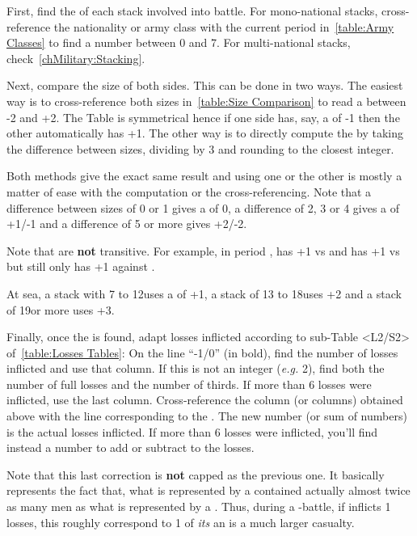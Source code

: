 First, find the  of each stack involved into battle. For
mono-national stacks, cross-reference the nationality or army class with the
current period in~\ref{table:Army Classes} to find a number between 0 and
7. For multi-national stacks, check~\ref{chMilitary:Stacking}.

Next, compare the size of both sides. This can be done in two ways. The
easiest way is to cross-reference both sizes in~\ref{table:Size Comparison} to
read a  between -2 and +2. The Table is symmetrical
hence if one side has, say, a  of -1 then the other
automatically has +1. The other way is to directly compute the  by taking the difference between sizes, dividing by 3 and
rounding to the closest integer.

Both methods give the exact same result and using one or the other is mostly a
matter of ease with the computation or the cross-referencing. Note that a
difference between sizes of 0 or 1 gives a  of 0, a
difference of 2, 3 or 4 gives a  of +1/-1 and a
difference of 5 or more gives +2/-2.

Note that  are \textbf{not} transitive. For example,
in period , \POL has +1 vs \FRA and \FRA has +1 vs \HIS but \POL
still only has +1 against \HIS.

At sea, a stack with 7 to 12\ND uses a  of +1, a
stack of 13 to 18\ND uses +2 and a stack of 19\ND or more uses +3.

\aparag Finally, once the  is found, adapt losses
inflicted according to sub-Table <L2/S2> of~\ref{table:Losses Tables}:
\bparag On the line ``-1/0'' (in bold), find the number of losses inflicted
and use that column. If this is not an integer (\emph{e.g.} 2\texttd), find
both the number of full losses and the number of thirds. If more than 6 losses
were inflicted, use the last column.
\bparag Cross-reference the column (or columns) obtained above with the line
corresponding to the . The new number (or sum of
numbers) is the actual losses inflicted. If more than 6 losses were inflicted,
you'll find instead a number to add or subtract to the losses.

Note that this last correction is \textbf{not} capped as the previous one. It
basically represents the fact that, what is represented by a \TUR \LD
contained actually almost twice as many men as what is represented by a \HIS
\LD. Thus, during a \TUR-\HIS battle, if \TUR inflicts 1 losses, this roughly
correspond to 1 of \emph{its} \LD an is a much larger \HIS casualty.

